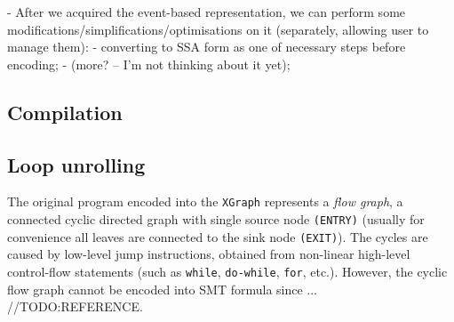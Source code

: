 - After we acquired the event-based representation, we can perform some modifications/simplifications/optimisations on it (separately, allowing user to manage them):
        - converting to SSA form as one of necessary steps before encoding;
        - (more? -- I'm not thinking about it yet);


\subsection{Compilation}
\label{ch:impl:y2x:compil}

\subsection{Loop unrolling}
\label{ch:impl:x2y:unrolling}

The original program encoded into the \texttt{XGraph} represents a \textit{flow graph}, a connected cyclic directed graph with single source node \texttt{(ENTRY)} (usually for convenience all leaves are connected to the sink node \texttt{(EXIT)}). The cycles are caused by low-level jump instructions, obtained from non-linear high-level control-flow statements (such as \texttt{while}, \texttt{do-while}, \texttt{for}, etc.). However, the cyclic flow graph cannot be encoded into SMT formula since ...
//TODO:REFERENCE.%



